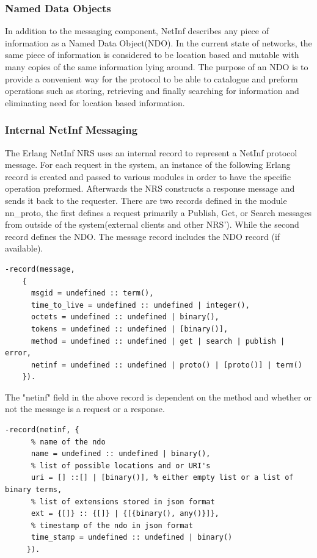 \subsubsection{Named Data Objects}
In addition to the messaging component, NetInf describes any piece of information as a Named Data Object(NDO). In the current state of networks, the same piece of information is considered to be location based and mutable with many copies of the same information lying around. The purpose of an NDO is to provide a convenient way for the protocol to be able to catalogue and preform operations such as storing, retrieving and finally searching for information and eliminating need for location based information.

\subsubsection{Internal NetInf Messaging}

The Erlang NetInf NRS uses an internal record to represent a NetInf protocol message. For each request in the system, an instance of the following Erlang record is created and passed to various modules in order to have the specific operation preformed. Afterwards the NRS constructs a response message and sends it back to the requester. There are two records defined in the module nn\_proto, the first defines a request primarily a Publish, Get, or Search messages from outside of the system(external clients and other NRS'). While the second record defines the NDO. The message record includes the NDO record (if available). 

\label{NDO-message}
\begin{verbatim}
-record(message, 
	{
	  msgid = undefined :: term(),
	  time_to_live = undefined :: undefined | integer(),
	  octets = undefined :: undefined | binary(),
	  tokens = undefined :: undefined | [binary()],
	  method = undefined :: undefined | get | search | publish | error,
	  netinf = undefined :: undefined | proto() | [proto()] | term()
	}).
\end{verbatim}

The "netinf" field in the above record is dependent on the method and whether or not the message is a request or a response.

\begin{verbatim}
-record(netinf, {
	  % name of the ndo
	  name = undefined :: undefined | binary(),
	  % list of possible locations and or URI's
	  uri = [] ::[] | [binary()], % either empty list or a list of binary terms,
	  % list of extensions stored in json format
	  ext = {[]} :: {[]} | {[{binary(), any()}]}, 
	  % timestamp of the ndo in json format
	  time_stamp = undefined :: undefined | binary() 
	 }).
\end{verbatim}

